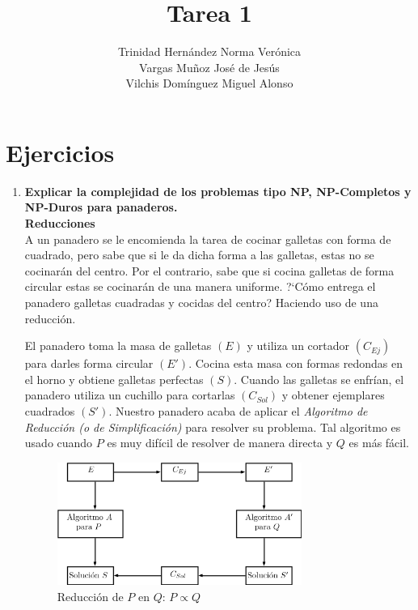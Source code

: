 \documentclass[11 pt, a4paper]{article}
\author{Trinidad Hern\'andez Norma Ver\'onica \\
        Vargas Mu\~noz Jos\'e de Jes\'us \\
        Vilchis Dom\'inguez Miguel Alonso}
\title{Tarea 1}
\theoremstyle{definition}
\begin{document}
\maketitle

\section{Ejercicios}

\begin{enumerate}

    \item \textbf{Explicar la complejidad de los problemas tipo NP, NP-Completos y NP-Duros para panaderos.}\\
            \textbf{Reducciones} \\ 
            A un panadero se le encomienda la tarea de cocinar galletas con forma de cuadrado, pero sabe que si
            le da dicha forma a las galletas, estas no se cocinar\'an del centro. Por el contrario, sabe que si cocina
            galletas de forma circular estas se cocinar\'an de una manera uniforme. ?`C\'omo entrega el panadero galletas
            cuadradas y cocidas del centro? Haciendo uso de una reducci\'on. \par

             \par

            El panadero toma la masa de galletas $(E)$ y utiliza un cortador $(C_{Ej})$ para darles forma circular
            $(E')$. Cocina esta masa con formas redondas en el horno y obtiene galletas perfectas $(S)$. Cuando las galletas se enfr\'ian, el panadero utiliza un cuchillo para cortarlas $(C_{Sol})$ y obtener ejemplares cuadrados $(S')$. Nuestro panadero acaba de aplicar el \emph{Algoritmo de Reducci\'on (o de Simplificaci\'on)} para resolver su problema. Tal algoritmo es usado cuando $P$ es muy dif\'icil de resolver de manera directa y
            $Q$ es m\'as f\'acil.

            \begin{figure}[h]
                \includegraphics[width=80mm]{Reduc_P_en_Q.png}
                \centering
                \caption{Reducci\'on de $P$ en $Q$: $P \propto Q$}
                \label{fig:PQ_Red}
            \end{figure}



\end{enumerate}
\end{document}
